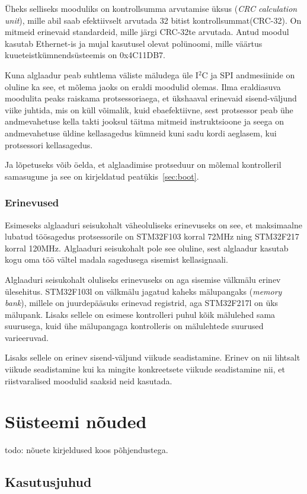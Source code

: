 \documentclass[12pt,a4paper]{article}
\newcommand{\iic}{I${}^2$C }
\begin{document}
Üheks selliseks mooduliks on kontrollsumma arvutamise üksus (\textit{CRC
calculation unit}), mille abil saab efektiivselt arvutada 32 bitist
kontrollsummat(CRC-32). On mitmeid erinevaid standardeid, mille järgi CRC-32te
arvutada. Antud moodul kasutab Ethernet-is ja mujal kasutusel olevat polünoomi,
mille väärtus kuueteistkümnendsüsteemis on 0x4C11DB7. 

Kuna alglaadur peab suhtlema väliste mäludega üle \iic ja SPI andmesiinide on
oluline ka see, et mõlema jaoks on eraldi moodulid olemas. Ilma eraldiasuva
moodulita peaks raiskama protsessoriaega, et ükshaaval erinevaid sisend-väljund
viike juhtida, mis on küll võimalik, kuid ebaefektiivne, sest protsessor peab
ühe andmevahetuse kella takti jooksul täitma mitmeid instruktsioone ja seega
on andmevahetuse üldine kellasagedus kümneid kuni sadu kordi aeglasem, kui
protsessori kellasagedus.

Ja lõpetuseks võib öelda, et alglaadimise protseduur on mõlemal kontrolleril
samasugune ja see on kirjeldatud peatükis~\ref{sec:boot}.

\subsubsection{Erinevused}
Esimeseks alglaaduri seisukohalt väheoluliseks erinevuseks on see, et
maksimaalne lubatud töösagedus protsessorile on STM32F103 korral 72MHz ning
STM32F217 korral 120MHz. Alglaaduri seisukohalt pole see oluline, sest alglaadur
kasutab kogu oma töö vältel madala sagedusega sisemist kellasignaali.

Alglaaduri seisukohalt oluliseks erinevuseks on aga sisemise välkmälu erinev
ülesehitus. STM32F103l on välkmälu jagatud kaheks mälupangaks (\textit{memory
bank}), millele on juurdepääsuks erinevad registrid, aga STM32F217l on üks
mälupank. Lisaks sellele on esimese kontrolleri puhul kõik mälulehed sama
suurusega, kuid ühe mälupangaga kontrolleris on mälulehtede suurused
varieeruvad. \cite{f1fpm,f2fpm}

Lisaks sellele on erinev sisend-väljund viikude seadistamine. Erinev on nii
lihtsalt viikude seadistamine kui ka mingite konkreetsete viikude seadistamine
nii, et riistvaralised moodulid saaksid neid kasutada.

\section{Süsteemi nõuded}
todo: nõuete kirjeldused koos põhjendustega.
\subsection{Kasutusjuhud}
\end{document}
